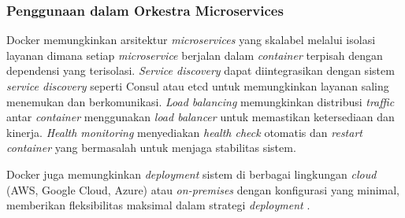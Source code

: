 \subsubsection{Penggunaan dalam Orkestra Microservices}

Docker memungkinkan arsitektur \emph{microservices} yang skalabel melalui isolasi layanan dimana setiap \emph{microservice} berjalan dalam \emph{container} terpisah dengan dependensi yang terisolasi. \emph{Service discovery} dapat diintegrasikan dengan sistem \emph{service discovery} seperti Consul atau etcd untuk memungkinkan layanan saling menemukan dan berkomunikasi. \emph{Load balancing} memungkinkan distribusi \emph{traffic} antar \emph{container} menggunakan \emph{load balancer} untuk memastikan ketersediaan dan kinerja. \emph{Health monitoring} menyediakan \emph{health check} otomatis dan \emph{restart container} yang bermasalah untuk menjaga stabilitas sistem.

Docker juga memungkinkan \emph{deployment} sistem di berbagai lingkungan \emph{cloud} (AWS, Google Cloud, Azure) atau \emph{on-premises} dengan konfigurasi yang minimal, memberikan fleksibilitas maksimal dalam strategi \emph{deployment} \parencite{ibmcontaineranalysis2017}.
